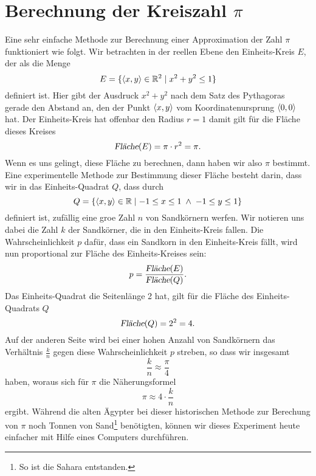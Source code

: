\section{Berechnung der Kreiszahl $\pi$}
Eine sehr einfache Methode zur Berechnung einer Approximation der Zahl $\pi$ funktioniert wie folgt.
Wir betrachten in der reellen Ebene den Einheits-Kreis $E$, der als die Menge
\[ E = \{ \pair(x,y) \in \mathbb{R}^2 \mid x^2 + y^2 \leq 1 \} \]
definiert ist.  Hier gibt der Ausdruck $x^2 + y^2$ nach dem Satz des Pythagoras gerade den Abstand an,
den der Punkt $\pair(x,y)$ vom Koordinatenursprung $\pair(0,0)$ hat.  Der Einheits-Kreis hat offenbar den
Radius $r = 1$ damit gilt f\"ur die Fl\"ache dieses Kreises
\[ \textsl{Fl\"ache}(E) = \pi \cdot r^2 = \pi. \]
Wenn es uns gelingt, diese Fl\"ache zu berechnen, dann haben wir also $\pi$ bestimmt.  Eine experimentelle
Methode zur Bestimmung dieser Fl\"ache besteht darin, dass wir in das Einheits-Quadrat $Q$, dass durch
\[ Q = \{ \pair(x,y) \in \mathbb{R} \mid -1 \leq x \leq 1 \;\wedge\; -1 \leq y \leq 1 \} \]
definiert ist, zuf\"allig eine gro\3e Zahl $n$ von Sandk\"ornern werfen.  Wir notieren uns dabei die Zahl $k$ 
der Sandk\"orner, die in den Einheits-Kreis fallen.  Die Wahrscheinlichkeit $p$ daf\"ur, dass ein Sandkorn in den
Einheits-Kreis f\"allt, wird nun proportional zur Fl\"ache des Einheits-Kreises sein:
\[ p = \frac{\textsl{Fl\"ache}(E)}{\textsl{Fl\"ache}(Q)}. \]
Das Einheits-Quadrat die Seitenl\"ange 2 hat, gilt f\"ur die Fl\"ache des Einheits-Quadrats $Q$ 
\[ \textsl{Fl\"ache}(Q) = 2^2 = 4. \]
Auf der anderen Seite wird bei einer hohen Anzahl von Sandk\"ornern das Verh\"altnis $\frac{k}{n}$ gegen diese
Wahrscheinlichkeit $p$ streben, so dass wir insgesamt
\[ \frac{k}{n} \approx \frac{\pi}{4} \]
haben, woraus sich f\"ur $\pi$ die N\"aherungsformel
\[ \pi \approx 4 \cdot \frac{k}{n} \]
ergibt.  W\"ahrend die alten Ägypter bei dieser historischen Methode zur Berechung von $\pi$ noch Tonnen von
Sand\footnote{So ist die Sahara entstanden.}
ben\"otigten,  k\"onnen wir dieses Experiment heute einfacher mit Hilfe eines Computers durchf\"uhren.

